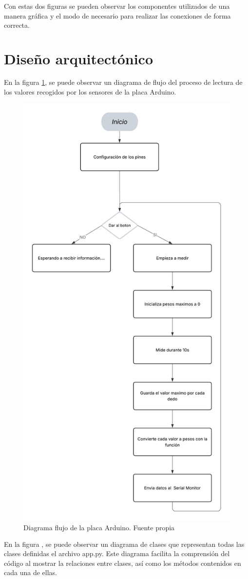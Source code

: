 Con estas dos figuras se pueden observar los componentes utilizados de una manera gráfica y el modo de necesario para realizar las conexiones de forma correcta.

\section{Diseño arquitectónico}

En la figura \ref{fig:Diagrama_flujo_arduino}, se puede observar un diagrama de flujo del proceso de lectura de los valores recogidos por los sensores de la placa Arduino. 

\begin{figure}
    \centering
    \includegraphics[width=0.5\linewidth]{img/Diagrama_flujo_arduino.png}
    \caption{Diagrama flujo de la placa Arduino. Fuente propia}
    \label{fig:Diagrama_flujo_arduino}
\end{figure}

En la figura , se puede observar un diagrama de clases que representan todas las clases definidas el archivo app.py. Este diagrama facilita la comprensión del código al mostrar la relaciones entre clases, así como los métodos contenidos en cada una de ellas.